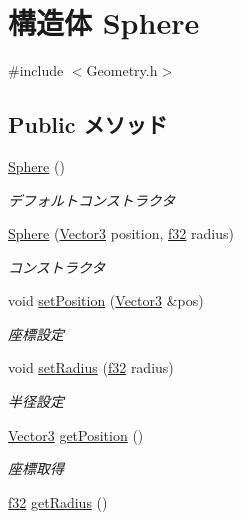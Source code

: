 \hypertarget{struct_sphere}{\section{構造体 Sphere}
\label{struct_sphere}
}


{\ttfamily \#include $<$Geometry.\-h$>$}

\subsection*{Public メソッド}
\begin{DoxyCompactItemize}
\item 
\hyperlink{struct_sphere_a890a63ff583cb88e7ec4e840b4ef5eb9}{Sphere} ()
\begin{DoxyCompactList}\small\item\em デフォルトコンストラクタ \end{DoxyCompactList}\item 
\hyperlink{struct_sphere_a41d320d6067f5b01b3c7a6a8190e72bb}{Sphere} (\hyperlink{struct_vector3}{Vector3} position, \hyperlink{_main_8h_a5f6906312a689f27d70e9d086649d3fd}{f32} radius)
\begin{DoxyCompactList}\small\item\em コンストラクタ \end{DoxyCompactList}\item 
void \hyperlink{struct_sphere_ae8842acfd980f63efc023b84980fb49d}{set\-Position} (\hyperlink{struct_vector3}{Vector3} \&pos)
\begin{DoxyCompactList}\small\item\em 座標設定 \end{DoxyCompactList}\item 
void \hyperlink{struct_sphere_afad4913bbde5bd6a47d220a29206bbeb}{set\-Radius} (\hyperlink{_main_8h_a5f6906312a689f27d70e9d086649d3fd}{f32} radius)
\begin{DoxyCompactList}\small\item\em 半径設定 \end{DoxyCompactList}\item 
\hyperlink{struct_vector3}{Vector3} \hyperlink{struct_sphere_a5e5181db4f2a86d94fff712bba98e900}{get\-Position} ()
\begin{DoxyCompactList}\small\item\em 座標取得 \end{DoxyCompactList}\item 
\hyperlink{_main_8h_a5f6906312a689f27d70e9d086649d3fd}{f32} \hyperlink{struct_sphere_a6564eb07eb9b62503ecc71d032e51e7b}{get\-Radius} ()

\end{DoxyCompactItemize}
